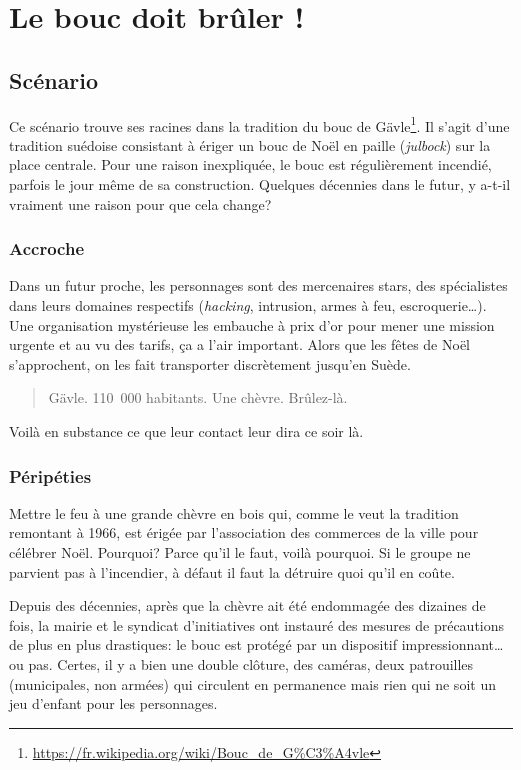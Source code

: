 \chapter{Le bouc doit brûler !}

\section{Scénario}

Ce scénario trouve ses racines dans la tradition du bouc de Gävle\footnote{\url{https://fr.wikipedia.org/wiki/Bouc_de_G%C3%A4vle}}.
Il s'agit d'une tradition suédoise consistant à ériger un bouc de Noël en paille (\emph{julbock}) sur la place centrale.
Pour une raison inexpliquée, le bouc est régulièrement incendié, parfois le jour même de sa construction.
Quelques décennies dans le futur, y a-t-il vraiment une raison pour que cela change?

\subsection{Accroche}

Dans un futur proche, les personnages sont des mercenaires stars, des spécialistes dans leurs domaines respectifs (\emph{hacking}, intrusion, armes à feu, escroquerie\dots).
Une organisation mystérieuse les embauche à prix d'or pour mener une mission urgente et au vu des tarifs, ça a l'air important.
Alors que les fêtes de Noël s'approchent, on les fait transporter discrètement jusqu'en Suède.

\blockquote{Gävle. 110 000 habitants. Une chèvre. Brûlez-là.}

Voilà en substance ce que leur contact leur dira ce soir là.

\subsection{Péripéties}

Mettre le feu à une grande chèvre en bois qui, comme le veut la tradition remontant à 1966, est érigée par l'association des commerces de la ville pour célébrer Noël.
Pourquoi? Parce qu'il le faut, voilà pourquoi.
Si le groupe ne parvient pas à l'incendier, à défaut il faut la détruire quoi qu'il en coûte.

Depuis des décennies, après que la chèvre ait été endommagée des dizaines de fois, la mairie et le syndicat d'initiatives ont instauré des mesures de précautions de plus en plus drastiques: le bouc est protégé par un dispositif impressionnant\dots ou pas.
Certes, il y a bien une double clôture, des caméras, deux patrouilles (municipales, non armées) qui circulent en permanence mais rien qui ne soit un jeu d'enfant pour les personnages.

